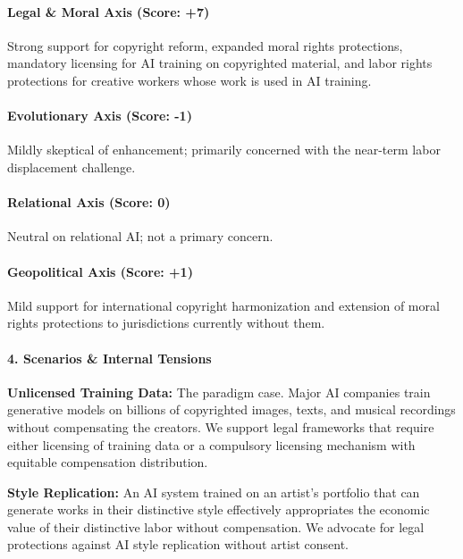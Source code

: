 \paragraph{Legal \& Moral Axis (Score:
+7)}\label{legal-moral-axis-score-7-2}

Strong support for copyright reform, expanded moral rights protections,
mandatory licensing for AI training on copyrighted material, and labor
rights protections for creative workers whose work is used in AI
training.

\paragraph{Evolutionary Axis (Score:
-1)}\label{evolutionary-axis-score--1-5}

Mildly skeptical of enhancement; primarily concerned with the near-term
labor displacement challenge.

\paragraph{Relational Axis (Score: 0)}\label{relational-axis-score-0-2}

Neutral on relational AI; not a primary concern.

\paragraph{Geopolitical Axis (Score:
+1)}\label{geopolitical-axis-score-1-3}

Mild support for international copyright harmonization and extension of
moral rights protections to jurisdictions currently without them.

\paragraph{4. Scenarios \& Internal
Tensions}\label{scenarios-internal-tensions-38}

\textbf{Unlicensed Training Data:} The paradigm case. Major AI companies
train generative models on billions of copyrighted images, texts, and
musical recordings without compensating the creators. We support legal
frameworks that require either licensing of training data or a
compulsory licensing mechanism with equitable compensation distribution.

\textbf{Style Replication:} An AI system trained on an artist's
portfolio that can generate works in their distinctive style effectively
appropriates the economic value of their distinctive labor without
compensation. We advocate for legal protections against AI style
replication without artist consent.

